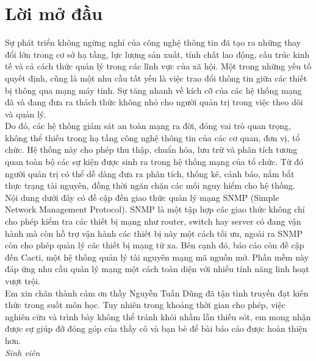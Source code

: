 \documentclass[12pt,oneside,a4paper]{article}
\begin{document}
	\setlength{\parindent}{0pt}

	\newpage
	\tableofcontents
	\newpage
	

\section*{Lời mở đầu}
%
Sự phát triển không ngừng nghỉ của công nghệ thông tin đã tạo ra những thay đổi lớn trong cơ sở hạ tầng, lực lượng sản xuất, tính chất lao động, cấu trúc kinh tế và cả cách thức quản lý trong các lĩnh vực của xã hội. Một trong những yếu tố quyết định, cũng là một nhu cầu tất yếu là việc trao đổi thông tin giữa các thiết bị thông qua mạng máy tính. Sự tăng nhanh về kích cỡ của các hệ thống mạng đã và đang đưa ra thách thức không nhỏ cho người quản trị trong việc theo dõi và quản lý.\\

Do đó, các hệ thống giám sát an toàn mạng ra đời, đóng vai trò quan trọng, không thể thiếu trong hạ tầng công nghệ thông tin của các cơ quan, đơn vị, tổ chức. Hệ thống này cho phép thu thập, chuẩn hóa, lưu trữ và phân tích tương quan toàn bộ các sự kiện được sinh ra trong hệ thống mạng của tổ chức. Từ đó người quản trị có thể dễ dàng đưa ra phân tích, thống kê, cảnh báo, nắm bắt thực trạng tài nguyên, đồng thời ngăn chặn các mối nguy hiểm cho hệ thống.\\

Nội dung dưới đây có đề cập đến giao thức quản lý mạng SNMP (Simple Network Management Protocol). SNMP là một tập hợp các giao thức không chỉ cho phép kiểm tra các thiết bị mạng như router, switch hay server có đang vận hành mà còn hỗ trợ vận hành các thiết bị này một cách tối ưu, ngoài ra SNMP còn cho phép quản lý các thiết bị mạng từ xa. Bên cạnh đó, báo cáo còn đề cập đến Cacti, một hệ thống quản lý tài nguyên mạng mã nguồn mở. Phần mềm này đáp ứng nhu cầu quản lý mạng một cách toàn diện với nhiều tính năng linh hoạt vượt trội.\\

Em xin chân thành cảm ơn thầy Nguyễn Tuấn Dũng đã tận tình truyền đạt kiến thức trong suốt môn học. Tuy nhiên trong khoảng thời gian cho phép, việc nghiên cứu và trình bày không thể tránh khỏi nhầm lẫn thiếu sót, em mong nhận được sự giúp đỡ đóng góp của thầy cô và bạn bè để bài báo cáo được hoàn thiện hơn.\\
\vspace{1cm}
\textit{Sinh viên}\\
\end{document}
